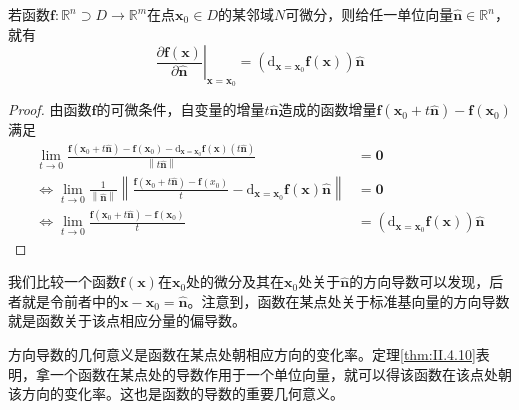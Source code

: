 \documentclass[main.tex]{subfiles}
\begin{document}
\begin{theorem}\label{thm:II.4.10}
    若函数$\mathbf{f}:\mathbb{R}^n\supset D\rightarrow\mathbb{R}^m$在点$\mathbf{x}_0\in D$的某邻域$N$可微分，则给任一单位向量$\mathbf{\hat{n}}\in\mathbb{R}^n$，就有
    \[\left.\frac{\partial\mathbf{f}\left(\mathbf{x}\right)}{\partial\mathbf{\hat{n}}}\right|_{\mathbf{x}=\mathbf{x}_0}=\left(\mathrm{d}_{\mathbf{x}=\mathbf{x}_0}\mathbf{f}\left(\mathbf{x}\right)\right)\mathbf{\hat{n}}\]
\end{theorem}
\begin{proof}
    由函数$\mathbf{f}$的可微条件，自变量的增量$t\mathbf{\hat{n}}$造成的函数增量$\mathbf{f}\left(\mathbf{x}_0+t\mathbf{\hat{n}}\right)-\mathbf{f}\left(\mathbf{x}_0\right)$满足
    \begin{align*}
        \lim_{t\to 0}\frac{\mathbf{f}\left(\mathbf{x}_0+t\mathbf{\hat{n}}\right)-\mathbf{f}\left(\mathbf{x}_0\right)-\mathrm{d}_{\mathbf{x}=\mathbf{x}_0}\mathbf{f}\left(\mathbf{x}\right)\left(t\mathbf{\hat{n}}\right)}{\left\|t\mathbf{\hat{n}}\right\|}                  & =\mathbf{0}                                                                                         \\
        \Leftrightarrow\lim_{t\to 0}\frac{1}{\left\|\mathbf{\hat{n}}\right\|}\left\|\frac{\mathbf{f}\left(\mathbf{x}_0+t\mathbf{\hat{n}}\right)-\mathbf{f}\left(x_0\right)}{t}-\mathrm{d}_{\mathbf{x}=\mathbf{x}_0}\mathbf{f}\left(\mathbf{x}\right)\mathbf{\hat{n}}\right\| & =\mathbf{0}                                                                                         \\
        \Leftrightarrow\lim_{t\to 0}\frac{\mathbf{f}\left(\mathbf{x}_0+t\mathbf{\hat{n}}\right)-\mathbf{f}\left(\mathbf{x}_0\right)}{t}                                                                                                                                      & =\left(\mathrm{d}_{\mathbf{x}=\mathbf{x}_0}\mathbf{f}\left(\mathbf{x}\right)\right)\mathbf{\hat{n}}
    \end{align*}
\end{proof}

我们比较一个函数$\mathbf{f}\left(\mathbf{x}\right)$在$\mathbf{x}_0$处的微分及其在$\mathbf{x}_0$处关于$\mathbf{\hat{n}}$的方向导数可以发现，后者就是令前者中的$\mathbf{x}-\mathbf{x}_0=\mathbf{\hat{n}}$。注意到，函数在某点处关于标准基向量的方向导数就是函数关于该点相应分量的偏导数。

方向导数的几何意义是函数在某点处朝相应方向的变化率。定理\ref{thm:II.4.10}表明，拿一个函数在某点处的导数作用于一个单位向量，就可以得该函数在该点处朝该方向的变化率。这也是函数的导数的重要几何意义。
\end{document}
